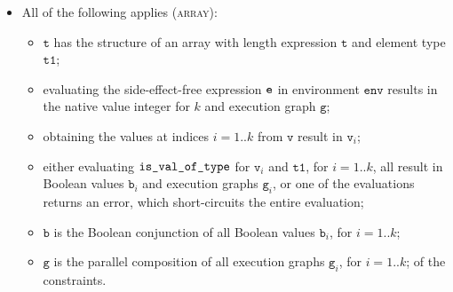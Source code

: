 \documentclass{book}
\newcommand\env[0]{\texttt{env}}
\newcommand\vg[0]{\texttt{g}}
\newcommand\vv[0]{\texttt{v}}
\newcommand\vt[0]{\texttt{t}}
\newcommand\vtone[0]{\texttt{t1}}
\newcommand\vb[0]{\texttt{b}}
\begin{document}
\begin{itemize}
  \item All of the following applies (\textsc{array}):
  \begin{itemize}
    \item $\vt$ has the structure of an array with length expression $\vt$
    and element type $\vtone$;
    \item evaluating the side-effect-free expression $\texttt{e}$ in environment $\env$
    results in the native value integer for $k$ and execution graph $\vg$;
    \item obtaining the values at indices $i=1..k$ from $\vv$ result in $\vv_i$;
    \item either evaluating $\texttt{is\_val\_of\_type}$ for $\vv_i$ and $\vtone$, for $i=1..k$,
    all result in Boolean values $\vb_i$ and execution graphs $\vg_i$,
    or one of the evaluations returns an error,
    which short-circuits the entire evaluation;
    \item $\vb$ is the Boolean conjunction of all Boolean values $\vb_i$, for $i=1..k$;
    \item $\vg$ is the parallel composition of all execution graphs $\vg_i$, for $i=1..k$;
    of the constraints.
  \end{itemize}
\end{itemize}

\end{document}
